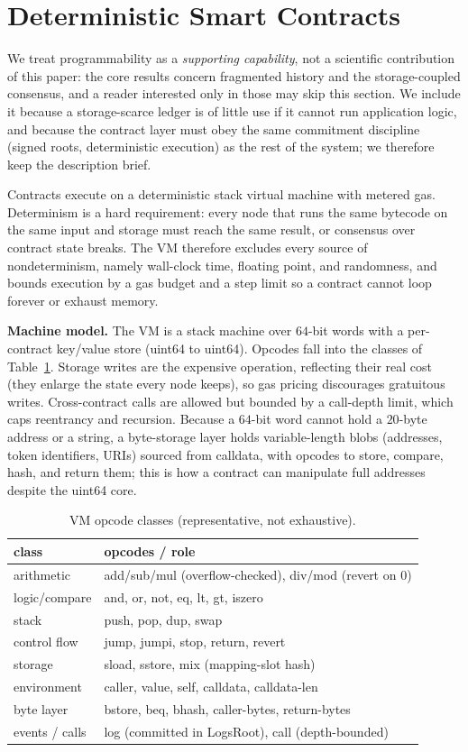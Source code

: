 \section{Deterministic Smart Contracts}
\label{sec:vm}
We treat programmability as a \emph{supporting capability}, not a scientific contribution of this
paper: the core results concern fragmented history and the storage-coupled consensus, and a reader
interested only in those may skip this section. We include it because a storage-scarce ledger is of
little use if it cannot run application logic, and because the contract layer must obey the same
commitment discipline (signed roots, deterministic execution) as the rest of the system; we
therefore keep the description brief.

Contracts execute on a deterministic stack virtual machine with metered gas. Determinism is a hard
requirement: every node that runs the same bytecode on the same input and storage must reach the
same result, or consensus over contract state breaks. The VM therefore excludes every source of
nondeterminism, namely wall-clock time, floating point, and randomness, and bounds execution by a
gas budget and a step limit so a contract cannot loop forever or exhaust memory.

\textbf{Machine model.} The VM is a stack machine over $64$-bit words with a per-contract
key/value store (uint64 to uint64). Opcodes fall into the classes of Table~\ref{tab:opcodes}.
Storage writes are the expensive operation, reflecting their real cost (they enlarge the state
every node keeps), so gas pricing discourages gratuitous writes. Cross-contract calls are allowed
but bounded by a call-depth limit, which caps reentrancy and recursion. Because a $64$-bit word
cannot hold a $20$-byte address or a string, a byte-storage layer holds variable-length blobs
(addresses, token identifiers, URIs) sourced from calldata, with opcodes to store, compare, hash,
and return them; this is how a contract can manipulate full addresses despite the uint64 core.

\begin{table}[t]
\centering
\caption{VM opcode classes (representative, not exhaustive).}
\label{tab:opcodes}
\small
\begin{tabular}{ll}
\toprule
class & opcodes / role \\
\midrule
arithmetic    & add/sub/mul (overflow-checked), div/mod (revert on $0$) \\
logic/compare & and, or, not, eq, lt, gt, iszero \\
stack         & push, pop, dup, swap \\
control flow  & jump, jumpi, stop, return, revert \\
storage       & sload, sstore, mix (mapping-slot hash) \\
environment   & caller, value, self, calldata, calldata-len \\
byte layer    & bstore, beq, bhash, caller-bytes, return-bytes \\
events / calls& log (committed in LogsRoot), call (depth-bounded) \\
\bottomrule
\end{tabular}
\end{table}

